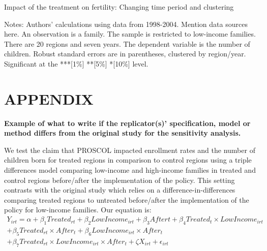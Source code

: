 \documentclass[12pt,a4paper]{article}
\begin{document}
\begin{footnotesize}
\begin{table}[H]
   \centering
   \caption{Impact of the treatment on fertility: Changing time period and clustering} \label{tab:table7}
   \begin{threeparttable}
         \footnotesize 
     
        \begin{tablenotes}
        \scriptsize 
        \item{Notes: Authors’ calculations using data from 1998-2004. Mention data sources here. An observation is a family. The sample is restricted to low-income families. There are 20 regions and seven years. The dependent variable is the number of children. Robust standard errors are in parentheses, clustered by region/year. Significant at the ***[1\%] **[5\%] *[10\%] level.
}
        \end{tablenotes}  
   \end{threeparttable}                          
\end{table}

\end{footnotesize}

\clearpage


\section{APPENDIX}

\textbf{Example of what to write if the replicator(s)’ specification, model or method differs from the original study for the sensitivity analysis.}

We test the claim that PROSCOL impacted enrollment rates and the number of children born for treated regions in comparison to control regions using a triple differences model comparing low-income and high-income families in treated and control regions before/after the implementation of the policy. This setting contrasts with the original study which relies on a difference-in-differences comparing treated regions to untreated before/after the implementation of the policy for low-income families. Our equation is:
\begin{multline}
Y_{irt} = \alpha + \beta_{1} Treated_{rt} + \beta_{2} LowIncome_{irt} + \beta_{3} After{t} +  \beta_{4} Treated_{t} \times LowIncome_{irt} \\ +  \beta_{5} Treated_{rt} \times After_{t} +  \beta_{6} LowIncome_{irt} \times After_{t} \\ +  \beta_{7} Treated_{rt} \times LowIncome_{irt} \times After_{t} + \zeta X_{irt} + \epsilon_{irt}
\end{multline}
\end{document}
